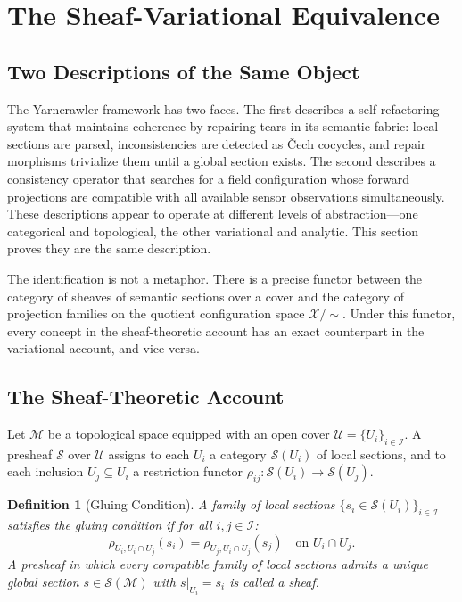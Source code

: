 \documentclass[12pt, oneside]{article}
\newtheorem{definition}[theorem]{Definition}
\newcommand{\Xmod}{\mathcal{X}/{\sim}}
\begin{document}
\section{The Sheaf-Variational Equivalence}
\label{sec:equivalence}

\subsection{Two Descriptions of the Same Object}

The Yarncrawler framework has two faces. The first describes a self-refactoring system
that maintains coherence by repairing tears in its semantic fabric: local sections are
parsed, inconsistencies are detected as \v{C}ech cocycles, and repair morphisms trivialize
them until a global section exists. The second describes a consistency operator that
searches for a field configuration whose forward projections are compatible with all
available sensor observations simultaneously. These descriptions appear to operate at
different levels of abstraction---one categorical and topological, the other variational
and analytic. This section proves they are the same description.

The identification is not a metaphor. There is a precise functor between the category of
sheaves of semantic sections over a cover and the category of projection families on the
quotient configuration space $\Xmod$. Under this functor, every concept in the
sheaf-theoretic account has an exact counterpart in the variational account, and vice
versa.

\subsection{The Sheaf-Theoretic Account}

Let $\mathcal{M}$ be a topological space equipped with an open cover
$\mathcal{U} = \{U_i\}_{i \in \mathcal{I}}$. A presheaf $\mathcal{S}$ over $\mathcal{U}$
assigns to each $U_i$ a category $\mathcal{S}(U_i)$ of local sections, and to each
inclusion $U_j \subseteq U_i$ a restriction functor
$\rho_{ij} : \mathcal{S}(U_i) \to \mathcal{S}(U_j)$.

\begin{definition}[Gluing Condition]
A family of local sections $\{s_i \in \mathcal{S}(U_i)\}_{i \in \mathcal{I}}$ satisfies
the \emph{gluing condition} if for all $i, j \in \mathcal{I}$:
\[
\rho_{U_i, U_i \cap U_j}(s_i) = \rho_{U_j, U_i \cap U_j}(s_j) \quad \text{on }
U_i \cap U_j.
\]
A presheaf in which every compatible family of local sections admits a unique global
section $s \in \mathcal{S}(\mathcal{M})$ with $s|_{U_i} = s_i$ is called a \emph{sheaf}.
\end{definition}
\end{document}
